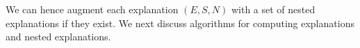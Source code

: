 We can hence augment each explanation $(E,S,N)$ with a set of nested explanations if they exist. We next discuss algorithms for computing explanations and nested explanations.



